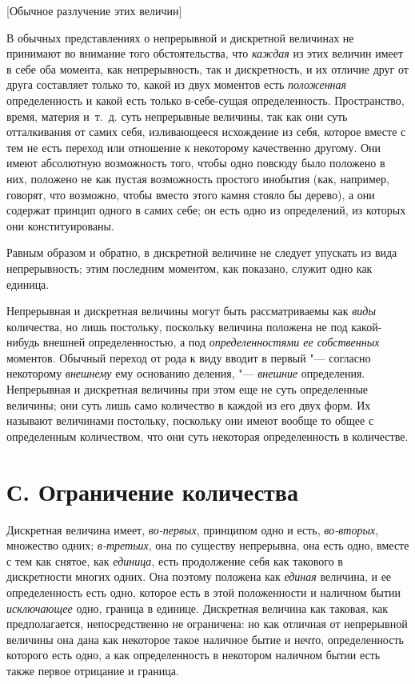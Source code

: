 %
  {[Обычное разлучение этих величин]}

В обычных представлениях о непрерывной и дискретной величинах не принимают
во внимание того обстоятельства, что {\em каждая} из
этих величин имеет в себе оба момента, как непрерывность, так и
дискретность, и их отличие друг от друга составляет только то, какой из
двух моментов есть {\em положенная} определенность и
какой есть только в-себе-сущая определенность. Пространство, время, материя
и~т.~д. суть непрерывные величины, так как они суть отталкивания от самих
себя, изливающееся исхождение из себя, которое вместе с тем не есть переход
или отношение к некоторому качественно другому. Они имеют абсолютную
возможность того, чтобы одно повсюду было положено в них, положено не как
пустая возможность простого инобытия (как, например, говорят, что возможно,
чтобы вместо этого камня стояло бы дерево), а они содержат принцип одного в
самих себе; он есть одно из определений, из которых они конституированы.

Равным образом и обратно, в дискретной величине не следует упускать из вида
непрерывность; этим последним моментом, как показано, служит одно как единица.

Непрерывная и дискретная величины могут быть рассматриваемы как
{\em виды} количества, но лишь постольку, поскольку
величина положена не под какой-нибудь внешней определенностью, а под
{\em определенностями ее собственных} моментов. Обычный
переход от рода к виду вводит в первый "--- согласно некоторому
{\em внешнему} ему основанию деления, "---
{\em внешние} определения. Непрерывная и дискретная
величины при этом еще не суть определенные величины; они суть лишь само
количество в каждой из его двух форм. Их называют величинами постольку,
поскольку они имеют вообще то общее с определенным количеством, что они
суть некоторая определенность в количестве.

\section[С. Ограничение количества]{С. Ограничение количества}
Дискретная величина имеет, {\em во-первых}, принципом
одно и есть, {\em во-вторых}, множество одних;
{\em в-третьих}, она по существу непрерывна, она есть
одно, вместе с тем как снятое, как {\em единица}, есть
продолжение себя как такового в дискретности многих одних. Она поэтому
положена как {\em единая} величина, и ее определенность
есть одно, которое есть в этой положенности и наличном бытии
{\em исключающее} одно, граница в единице. Дискретная
величина как таковая, как предполагается, непосредственно не ограничена: но
как отличная от непрерывной величины она дана как некоторое такое наличное
бытие и нечто, определенность которого есть одно, а как определенность в
некотором наличном бытии есть также первое отрицание и граница.


